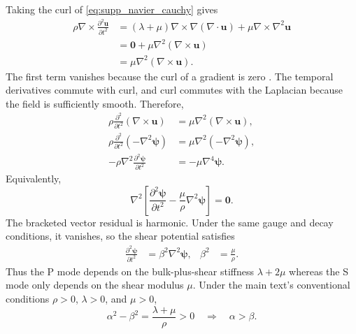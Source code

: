 Taking the curl of \cref{eq:supp_navier_cauchy} gives
\begin{equation*}
  \begin{aligned}
    \rho\nabla \times \frac{\partial^2\mathbf{u}}{\partial t^2}
    & = (\lambda + \mu)\nabla \times \nabla(\nabla \cdot \mathbf{u})
    +\mu\nabla \times \nabla^2\mathbf{u} \\
    & = \mathbf{0} + \mu\nabla^2(\nabla \times \mathbf{u}) \\
    & = \mu\nabla^2(\nabla \times \mathbf{u}).
  \end{aligned}
\end{equation*}
The first term vanishes because the curl of a gradient is zero . The temporal
derivatives commute with curl, and curl commutes with the Laplacian because the
field is sufficiently smooth. Therefore,
\begin{equation*}
  \begin{aligned}
    \rho\frac{\partial^2}{\partial t^2}(\nabla \times \mathbf{u})
    & = \mu\nabla^2(\nabla \times \mathbf{u}), \\
    \rho\frac{\partial^2}{\partial t^2}(-\nabla^2\boldsymbol{\psi})
    & = \mu\nabla^2(-\nabla^2\boldsymbol{\psi}), \\
    - \rho\nabla^2\frac{\partial^2\boldsymbol{\psi}}{\partial t^2}
    & = -\mu\nabla^4\boldsymbol{\psi}.
  \end{aligned}
\end{equation*}
Equivalently,
\begin{equation*}
  \nabla^2\left[\frac{\partial^2\boldsymbol{\psi}}{\partial t^2}
    - \frac{\mu}{\rho}\nabla^2\boldsymbol{\psi}
  \right] = \mathbf{0}.
\end{equation*}
The bracketed vector residual is harmonic. Under the same gauge and decay
conditions, it vanishes, so the shear potential satisfies
\begin{equation}
  \begin{aligned}
    \frac{\partial^2\boldsymbol{\psi}}{\partial t^2}
    & = \beta^2\nabla^2\boldsymbol{\psi},
    &\beta^2& = \frac{\mu}{\rho}.
  \end{aligned}
  \label{eq:supp_s_wave_equation}
\end{equation}
Thus the P mode depends on the bulk-plus-shear stiffness $\lambda + 2\mu$
whereas the S mode only depends on the shear modulus $\mu$. Under the
main text's conventional conditions $\rho > 0$, $\lambda > 0$, and $\mu > 0$,
\begin{equation*}
  \alpha^2 - \beta^2 = \frac{\lambda + \mu}{\rho} > 0
  \quad\Longrightarrow\quad \alpha > \beta.
\end{equation*}

